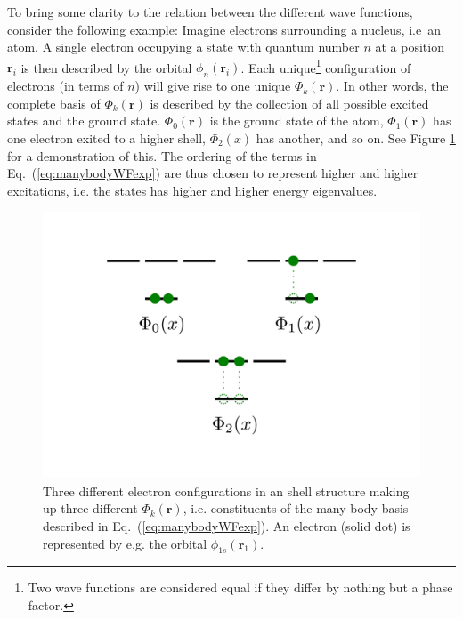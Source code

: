 To bring some clarity to the relation between the different wave functions, consider the following example: Imagine electrons surrounding a nucleus, i.e~an atom. A single electron occupying a state with quantum number $n$ at a position $\mathbf{r}_i$ is then described by the orbital $\phi_n(\mathbf{r}_i)$. Each unique\footnote{Two wave functions are considered equal if they differ by nothing but a phase factor.} configuration of electrons (in terms of $n$) will give rise to one unique $\Phi_k(\mathbf{r})$. In other words, the complete basis of $\Phi_k(\mathbf{r})$ is described by the collection of all possible excited states and the ground state. $\Phi_0(\mathbf{r})$ is the ground state of the atom, $\Phi_1(\mathbf{r})$ has one electron exited to a higher shell, $\Phi_2(x)$ has another, and so on. See Figure \ref{fig:AtomicOrbitals} for a demonstration of this. The ordering of the terms in Eq.~(\ref{eq:manybodyWFexp}) are thus chosen to represent higher and higher excitations, i.e. the states has higher and higher energy eigenvalues.

\begin{figure}
 \begin{center}
  \includegraphics[scale=0.5]{../Graphics/shellStructure.pdf}
  \caption{Three different electron configurations in an shell structure making up three different $\Phi_k(\mathbf{r})$, i.e. constituents of the many-body basis described in Eq.~(\ref{eq:manybodyWFexp}). An electron (solid dot) is represented by e.g. the orbital $\phi_{1s}(\mathbf{r}_1)$.}
  \label{fig:AtomicOrbitals}
 \end{center}
\end{figure}

